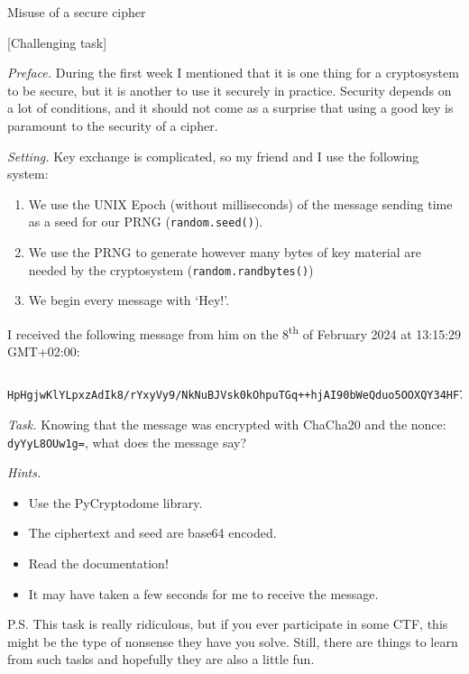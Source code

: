 \documentclass{practice}
\begin{document}
\begin{task}{Misuse of a secure cipher}

  [Challenging task]

  \textit{Preface.}
  During the first week I mentioned that it is one thing for a cryptosystem to be secure, but it is another to use it securely in practice.
  Security depends on a lot of conditions, and it should not come as a surprise that using a good key is paramount to the security of a cipher.

  \textit{Setting.}
  Key exchange is complicated, so my friend and I use the following system:
  \begin{enumerate}
    \item We use the UNIX Epoch (without milliseconds) of the message sending time as a seed for our PRNG (\texttt{random.seed()}).
    \item We use the PRNG to generate however many bytes of key material are needed by the cryptosystem (\texttt{random.randbytes()})
    \item We begin every message with `Hey!'.
  \end{enumerate}

  I received the following message from him on the 8\textsuperscript{th} of February 2024 at 13:15:29 GMT+02:00:
  \begin{lstlisting}
  HpHgjwKlYLpxzAdIk8/rYxyVy9/NkNuBJVsk0kOhpuTGq++hjAI90bWeQduo5OOXQY34HF7aOek6GgedJd2npLhhezDO29RF5zzijA==
  \end{lstlisting}

  \textit{Task.}
  Knowing that the message was encrypted with ChaCha20 and the nonce: \texttt{dyYyL8OUw1g=}, what does the message say?

  \textit{Hints.}
  \begin{itemize}
    \item Use the PyCryptodome library.
    \item The ciphertext and seed are base64 encoded.
    \item Read the documentation!
    \item It may have taken a few seconds for me to receive the message.
  \end{itemize}

  P.S. This task is really ridiculous, but if you ever participate in some CTF, this might be the type of nonsense they have you solve.
  Still, there are things to learn from such tasks and hopefully they are also a little fun.
\end{task}

\end{document}
